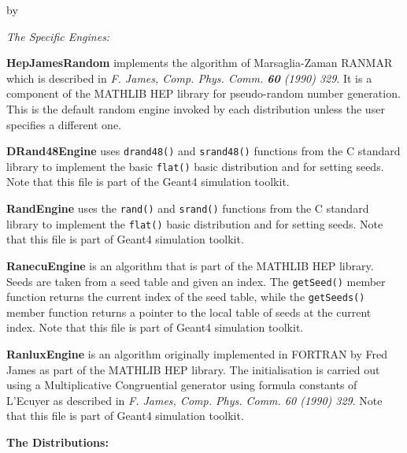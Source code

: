 \documentclass[twoside]{article}
\newcommand{\comp}[1]{\texttt{#1}}%
\newcommand{\entrylabel}[1]{\mbox{\textbf{{#1}}}\hfil}%
\newenvironment{entry}
{\begin{list}{}%
    {\renewcommand{\makelabel}{\entrylabel}%
     \setlength{\labelwidth}{90pt}%
     \setlength{\leftmargin}{\labelwidth}
     \advance\leftmargin by \labelsep%
      }%
    }%
  {\end{list}}
\newcommand{\Entrylabel}[1]%
{\raisebox{0pt}[1ex][0pt]{\makebox[\labelwidth][l]%
    {\parbox[t]{\labelwidth}{\hspace{0pt}\textbf{{#1}}}}}}
\newenvironment{Entry}%
{\renewcommand{\entrylabel}{\Entrylabel}\begin{entry}}%
  {\end{entry}}
\begin{document}
\begin{description}
\begin{Entry}
     {\em The Specific Engines:}
     
     \begin{description}
       \item {\bf HepJamesRandom} implements the algorithm of
       Marsaglia-Zaman RANMAR which is described in
       {\em F.  James, Comp. Phys. Comm. {\bf 60} (1990) 329}.  It is a
       component of the MATHLIB HEP library for pseudo-random
       number generation.  This is the default random engine invoked
       by each distribution unless the user specifies a different one.

       \item {\bf DRand48Engine} uses \comp{drand48()}
         and \comp{srand48()} functions from the C standard library
         to implement the basic \comp{flat()} basic distribution and
         for setting seeds.  Note that this file is part of the
         Geant4  simulation toolkit.

       \item {\bf RandEngine} uses the \comp{rand()} and \comp{srand()}
         functions from the C standard library to implement the \comp{flat()}
         basic distribution and for setting seeds.  Note that this file is
         part of Geant4 simulation toolkit.

       \item {\bf RanecuEngine} is an algorithm that is part of the
         MATHLIB HEP library.  Seeds are taken from a seed table
         and given an index.  The \comp{getSeed()} member function
         returns the current index of the seed table, while the
         \comp{getSeeds()} member function returns a pointer to the
         local table of seeds at the current index.  Note that this file
         is part of Geant4 simulation toolkit.

       \item {\bf RanluxEngine} is an algorithm originally implemented
         in FORTRAN by Fred James as part of the MATHLIB HEP
         library.  The initialisation is carried out using a
         Multiplicative Congruential generator using formula constants
         of L'Ecuyer as described in {\em F. James, Comp. Phys. Comm. 60 (1990) 329}.
         Note that this file is part of Geant4 simulation toolkit.
     \end{description}

  {\bf The Distributions:}
  

\end{Entry}
\end{description}
\end{document}
